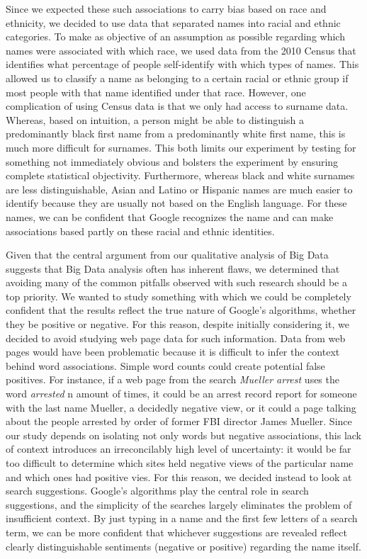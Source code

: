 \documentclass[sigconf]{acmart}
\begin{document}
Since we expected these such associations to carry bias based on race and ethnicity, we decided to use data that separated names into racial and ethnic categories. To make as objective of an assumption as possible regarding which names were associated with which race, we used data from the 2010 Census that identifies what percentage of people self-identify with which types of names. This allowed us to classify a name as belonging to a certain racial or ethnic group if most people with that name identified under that race. However, one complication of using Census data is that we only had access to surname data. Whereas, based on intuition, a person might be able to distinguish a predominantly black first name from a predominantly white first name, this is much more difficult for surnames. This both limits our experiment by testing for something not immediately obvious and bolsters the experiment by ensuring complete statistical objectivity. Furthermore, whereas black and white surnames are less distinguishable, Asian and Latino or Hispanic names are much easier to identify because they are usually not based on the English language. For these names, we can be confident that Google recognizes the name and can make associations based partly on these racial and ethnic identities.

Given that the central argument from our qualitative analysis of Big Data suggests that Big Data analysis often has inherent flaws, we determined that avoiding many of the common pitfalls observed with such research should be a top priority. We wanted to study something with which we could be completely confident that the results reflect the true nature of Google's algorithms, whether they be positive or negative. For this reason, despite initially considering it, we decided to avoid studying web page data for such information. Data from web pages would have been problematic because it is difficult to infer the context behind word associations. Simple word counts could create potential false positives. For instance, if a web page from the search {\em Mueller arrest} uses the word {\em arrested} n amount of times, it could be an arrest record report for someone with the last name Mueller, a decidedly negative view, or it could a page talking about the people arrested by order of former FBI director James Mueller. Since our study depends on isolating not only words but negative associations, this lack of context introduces an irreconcilably high level of uncertainty: it would be far too difficult to determine which sites held negative views of the particular name and which ones had positive vies. For this reason, we decided instead to look at search suggestions. Google's algorithms play the central role in search suggestions, and the simplicity of the searches largely eliminates the problem of insufficient context. By just typing in a name and the first few letters of a search term, we can be more confident that whichever suggestions are revealed reflect clearly distinguishable sentiments (negative or positive) regarding the name itself.
\end{document}
